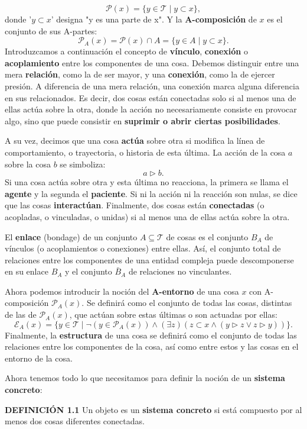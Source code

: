 {\fontsize{13}{15}\selectfont
$$ \mathcal{P}(x) = \{y \in \mathcal{T} \mid y \subset x\}, $$
donde '$y \subset x$' designa "y es una parte de x". Y la \textbf{A-composición} de $x$ es el conjunto de sus A-partes:
$$ \mathcal{P}_A(x) = \mathcal{P}(x) \cap A = \{y \in A \mid y \subset x\}. $$
Introduzcamos a continuación el concepto de \textbf{vínculo}, \textbf{conexión} o \textbf{acoplamiento} entre los componentes de una cosa. Debemos distinguir entre una mera \textbf{relación}, como la de ser mayor, y una \textbf{conexión}, como la de ejercer presión. A diferencia de una mera relación, una conexión marca alguna diferencia en sus relacionados. Es decir, dos cosas están conectadas solo si al menos una de ellas actúa sobre la otra, donde la acción no necesariamente consiste en provocar algo, sino que puede consistir en \textbf{suprimir o abrir ciertas posibilidades}.

A su vez, decimos que una cosa \textbf{actúa} sobre otra si modifica la línea de comportamiento, o trayectoria, o historia de esta última. La acción de la cosa $a$ sobre la cosa $b$ se simboliza:
$$ a \triangleright b. $$
Si una cosa actúa sobre otra y esta última no reacciona, la primera se llama el \textbf{agente} y la segunda el \textbf{paciente}. Si ni la acción ni la reacción son nulas, se dice que las cosas \textbf{interactúan}. Finalmente, dos cosas están \textbf{conectadas} (o acopladas, o vinculadas, o unidas) si al menos una de ellas actúa sobre la otra.

El \textbf{enlace} (bondage) de un conjunto $A \subseteq \mathcal{T}$ de cosas es el conjunto $B_A$ de vínculos (o acoplamientos o conexiones) entre ellas. Así, el conjunto total de relaciones entre los componentes de una entidad compleja puede descomponerse en su enlace $B_A$ y el conjunto $\bar{B}_A$ de relaciones no vinculantes.

Ahora podemos introducir la noción del \textbf{A-entorno} de una cosa $x$ con A-composición $\mathcal{P}_A(x)$. Se definirá como el conjunto de todas las cosas, distintas de las de $\mathcal{P}_A(x)$, que actúan sobre estas últimas o son actuadas por ellas:
$$ \mathcal{E}_A(x) = \{y \in \mathcal{T} \mid \neg (y \in \mathcal{P}_A(x)) \land (\exists z)(z \subset x \land (y \triangleright z \lor z \triangleright y))\}. $$
Finalmente, la \textbf{estructura} de una cosa se definirá como el conjunto de todas las relaciones entre los componentes de la cosa, así como entre estos y las cosas en el entorno de la cosa.

Ahora tenemos todo lo que necesitamos para definir la noción de un \textbf{sistema concreto}:

\textbf{DEFINICIÓN 1.1} Un objeto es un \textbf{sistema concreto} si está compuesto por al menos dos cosas diferentes conectadas.
}


